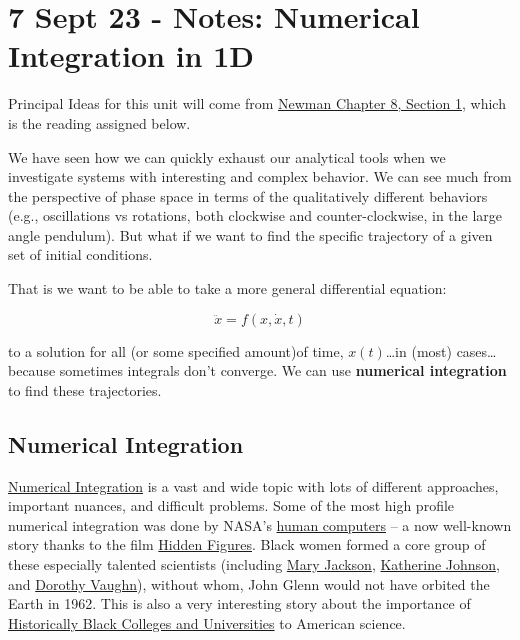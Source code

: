 \section{7 Sept 23 - Notes: Numerical Integration in
1D}\label{sept-23---notes-numerical-integration-in-1d}

Principal Ideas for this unit will come from
\href{https://github.com/dannycab/phy415msu/blob/main/MMIPbook/assets/pdfs/scans/Newman_Ch8_ODEs.pdf}{Newman
Chapter 8, Section 1}, which is the reading assigned below.

We have seen how we can quickly exhaust our analytical tools when we
investigate systems with interesting and complex behavior. We can see
much from the perspective of phase space in terms of the qualitatively
different behaviors (e.g., oscillations vs rotations, both clockwise and
counter-clockwise, in the large angle pendulum). But what if we want to
find the specific trajectory of a given set of initial conditions.

That is we want to be able to take a more general differential equation:

\[\ddot{x} = f(x,\dot{x},t)\]

to a solution for all (or some specified amount)of time,
\(x(t)\)\ldots in (most) cases\ldots because sometimes integrals don't
converge. We can use \textbf{numerical integration} to find these
trajectories.

\subsection{Numerical Integration}\label{numerical-integration}

\href{https://en.wikipedia.org/wiki/Numerical_integration}{Numerical
Integration} is a vast and wide topic with lots of different approaches,
important nuances, and difficult problems. Some of the most high profile
numerical integration was done by NASA's
\href{https://education.nationalgeographic.org/resource/women-nasa}{human
computers} -- a now well-known story thanks to the film
\href{https://en.wikipedia.org/wiki/Hidden_Figures}{Hidden Figures}.
Black women formed a core group of these especially talented scientists
(including
\href{https://en.wikipedia.org/wiki/Mary_Jackson_(engineer)}{Mary
Jackson},
\href{https://en.wikipedia.org/wiki/Katherine_Johnson}{Katherine
Johnson}, and
\href{https://en.wikipedia.org/wiki/Dorothy_Vaughan}{Dorothy Vaughn}),
without whom, John Glenn would not have orbited the Earth in 1962. This
is also a very interesting story about the importance of
\href{https://en.wikipedia.org/wiki/Historically_black_colleges_and_universities}{Historically
Black Colleges and Universities} to American science.

